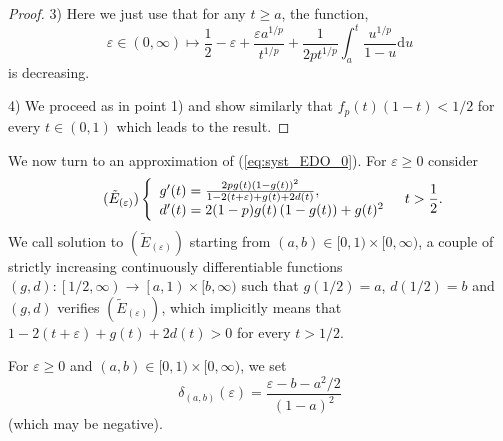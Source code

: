 \documentclass[a4, 11pt]{article}
\numberwithin{equation}{section}
\theoremstyle{plain}
\theoremstyle{definition}
\theoremstyle{remark}
\begin{document}
\begin{proof}
3) Here we just use that for any $t \geq a$, the function,
$$
\varepsilon \in (0,\infty) \mapsto \frac{1}{2}-\varepsilon + \frac{\varepsilon a^{1/p}}{t^{1/p}}+\frac{1}{2pt^{1/p}}\int_{a}^t  \frac{u^{1/p}}{1-u}\mathrm{d}u
$$
is decreasing.

4) We proceed as in point 1) and show similarly that $f_p(t)(1-t)<1/2$ for every $t\in (0,1)$ which leads to the result.
\end{proof}

We now turn to an approximation of (\ref{eq:syst_EDO_0}). For $\varepsilon\geq 0$ consider
\begin{equation}
\tag{$\tilde{E}_{(\varepsilon)}$}
\label{eq:syst_EDO}
	\left\{
	\begin{array}{ll}
		g'(t)=\frac{2pg(t)\left(1-g(t)\right)^2}{1-2(t+\varepsilon)+g(t)+2d(t)},\\
		d'(t)=2(1-p)g(t)\left(1-g(t)\right)+g(t)^2
	\end{array}
	\quad t>\frac{1}{2}.
	\right.
\end{equation}
We call solution to $(\tilde E_{(\varepsilon)})$ starting from $(a,b)\in [0,1)\times [0,\infty)$, a couple of strictly increasing continuously differentiable functions $(g,d):\left[1/2,\infty\right) \to \left[a,1\right)\times [b,\infty)$ such that $g\left({1}/{2}\right)=a$, $d\left({1}/{2}\right)=b$ and $(g,d)$ verifies $(\tilde{E}_{(\varepsilon)})$, which implicitly means that $1-2(t+\varepsilon)+g(t)+2d(t)>0$ for every $t>1/2$.

For $\varepsilon\geq 0$ and $\left(a,b\right)\in [0,1)\times [0,\infty)$, we set
$$\delta_{(a,b)}(\varepsilon)=\frac{\varepsilon-b-a^2/2}{\left(1-a\right)^2}$$
(which may be negative).
\end{document}
